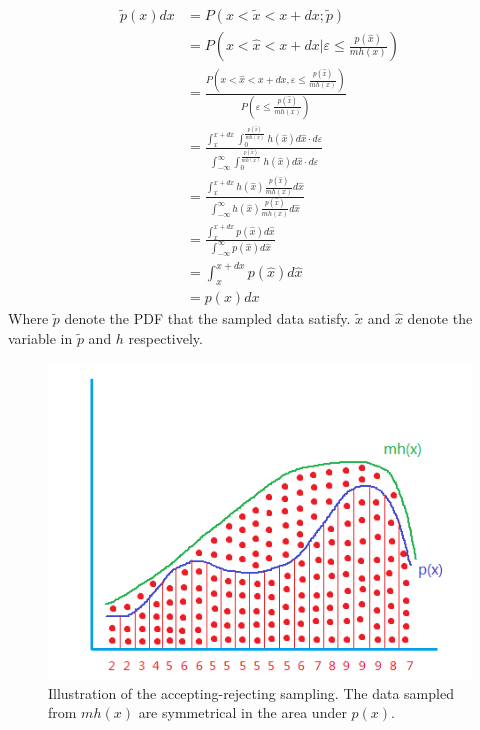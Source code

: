 \documentclass[runningheads,openany]{xhlPaper}
\begin{document}
\begin{equation}
\label{equ:sampAcceptingRejectingProof}
\begin{aligned}
\tilde p\left( x \right)dx &= P\left( {x < \tilde x < x + dx; \tilde{p}} \right)\\
 &= P\left( {x < \hat x < x + dx|\varepsilon  \le \frac{{p\left( {\hat x} \right)}}{{mh\left( x \right)}}} \right)\\
 &= \frac{{P\left( {x < \hat x < x + dx,\varepsilon  \le \frac{{p\left( {\hat x} \right)}}{{mh\left( x \right)}}} \right)}}{{P\left( {\varepsilon  \le \frac{{p\left( {\hat x} \right)}}{{mh\left( x \right)}}} \right)}}\\
 &= \frac{{\int_x^{x + dx} {\int_0^{\frac{{p\left( {\hat x} \right)}}{{mh\left( x \right)}}} {h\left( {\hat x} \right)d\hat x \cdot d\varepsilon } } }}{{\int_{ - \infty }^\infty  {\int_0^{\frac{{p\left( {\hat x} \right)}}{{mh\left( x \right)}}} {h\left( {\hat x} \right)d\hat x \cdot d\varepsilon } } }}\\
 &= \frac{{\int_x^{x + dx} {h\left( {\hat x} \right)\frac{{p\left( {\hat x} \right)}}{{mh\left( x \right)}}d\hat x} }}{{\int_{ - \infty }^\infty  {h\left( {\hat x} \right)\frac{{p\left( {\hat x} \right)}}{{mh\left( x \right)}}d\hat x} }}\\
 &= \frac{{\int_x^{x + dx} {p\left( {\hat x} \right)d\hat x} }}{{\int_{ - \infty }^\infty  {p\left( {\hat x} \right)d\hat x} }}\\
 &= \int_x^{x + dx} {p\left( {\hat x} \right)d\hat x} \\
 &= p\left( x \right)dx
\end{aligned}
\end{equation}
Where $\tilde{p}$ denote the PDF that the sampled data satisfy. ${\tilde x}$ and ${\hat x}$ denote the variable in $\tilde{p}$ and $h$ respectively.

\begin{figure}
\centering
\includegraphics[width=0.7\linewidth]{sampAcceptingRejecting}
\caption{Illustration of the accepting-rejecting sampling. The data sampled from $mh\left(x\right)$ are symmetrical in the area under $p\left(x\right)$. }
\label{fig:sampAcceptingRejecting}
\end{figure}
\end{document}
